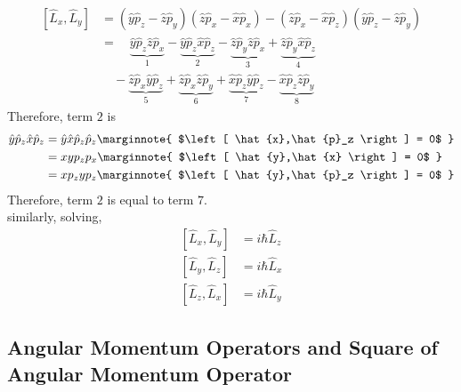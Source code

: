 \documentclass[titlepage, fleqn, a4paper, 12pt, twoside]{article}
\theoremstyle{definition}
\theoremstyle{theorem}
\begin{document}
\begin{align*}
	\left[ \hat{L}_x,\hat{L}_y \right] &= \left( \hat{y} \hat{p}_z - \hat{z} \hat{p}_y \right) \left( \hat{z} \hat{p}_x - \hat{x} \hat{p}_x \right) - \left( \hat{z} \hat{p}_x - \hat{x} \hat{p}_z \right) \left( \hat{y} \hat{p}_z - \hat{z} \hat{p}_y \right)\\
	&= \quad \underbrace{\hat{y} \hat{p}_z \hat{z} \hat{p}_x}_{1} - \underbrace{\hat{y} \hat{p}_z \hat{x} \hat{p}_z}_{2} - \underbrace{\hat{z} \hat{p}_y \hat{z} \hat{p}_x}_{3} + \underbrace{\hat{z} \hat{p}_y \hat{x} \hat{p}_z}_{4}\\
	&\quad - \underbrace{\hat{z} \hat{p}_x \hat{y} \hat{p}_z}_{5} + \underbrace{\hat{z} \hat{p}_x \hat{z} \hat{p}_y}_{6} + \underbrace{\hat{x} \hat{p}_z \hat{y} \hat{p}_z}_{7} - \underbrace{\hat{x} \hat{p}_z \hat{z} \hat{p}_y}_{8}
\end{align*}
Therefore, term $2$ is
\begin{align*}
	\hat{y} \hat{p}_z \hat{x} \hat{p}_z &= \hat{y} \hat{x} \hat{p}_z \hat{p}_z
	\marginnote
	{
		$\left[ \hat{x},\hat{p}_z \right] = 0$
	}\\
	&= x y p_z p_x
	\marginnote
	{
		$\left[ \hat{y},\hat{x} \right] = 0$
	}\\
	&= x p_z y p_z
	\marginnote
	{
		$\left[ \hat{y},\hat{p}_z \right] = 0$
	}
\end{align*}
Therefore, term $2$ is equal to term $7$.\\
similarly, solving,
\begin{align*}
	\left[ \hat{L}_x,\hat{L}_y \right] &= i \hbar \hat{L}_z\\
	\left[ \hat{L}_y,\hat{L}_z \right] &= i \hbar \hat{L}_x\\
	\left[ \hat{L}_z,\hat{L}_x \right] &= i \hbar \hat{L}_y
\end{align*}

\subsection{Angular Momentum Operators and Square of Angular Momentum Operator}
\end{document}
